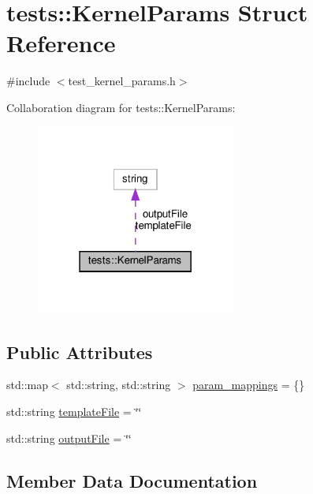 \hypertarget{structtests_1_1KernelParams}{}\section{tests\+:\+:Kernel\+Params Struct Reference}
\label{structtests_1_1KernelParams}


{\ttfamily \#include $<$test\+\_\+kernel\+\_\+params.\+h$>$}



Collaboration diagram for tests\+:\+:Kernel\+Params\+:\nopagebreak
\begin{figure}[H]
\begin{center}
\leavevmode
\includegraphics[width=187pt]{structtests_1_1KernelParams__coll__graph}
\end{center}
\end{figure}
\subsection*{Public Attributes}
\begin{DoxyCompactItemize}
\item 
std\+::map$<$ std\+::string, std\+::string $>$ \hyperlink{structtests_1_1KernelParams_a80bd8fec07cf507128923b01df069162}{param\+\_\+mappings} = \{\}
\item 
std\+::string \hyperlink{structtests_1_1KernelParams_aba4e8ce0e7f164dae2e76e492d2dc560}{template\+File} = \char`\"{}\char`\"{}
\item 
std\+::string \hyperlink{structtests_1_1KernelParams_a36fa86475bbc1dd064d1e362f74c0a50}{output\+File} = \char`\"{}\char`\"{}
\end{DoxyCompactItemize}


\subsection{Member Data Documentation}
\mbox{\label{structtests_1_1KernelParams_a36fa86475bbc1dd064d1e362f74c0a50}} 
